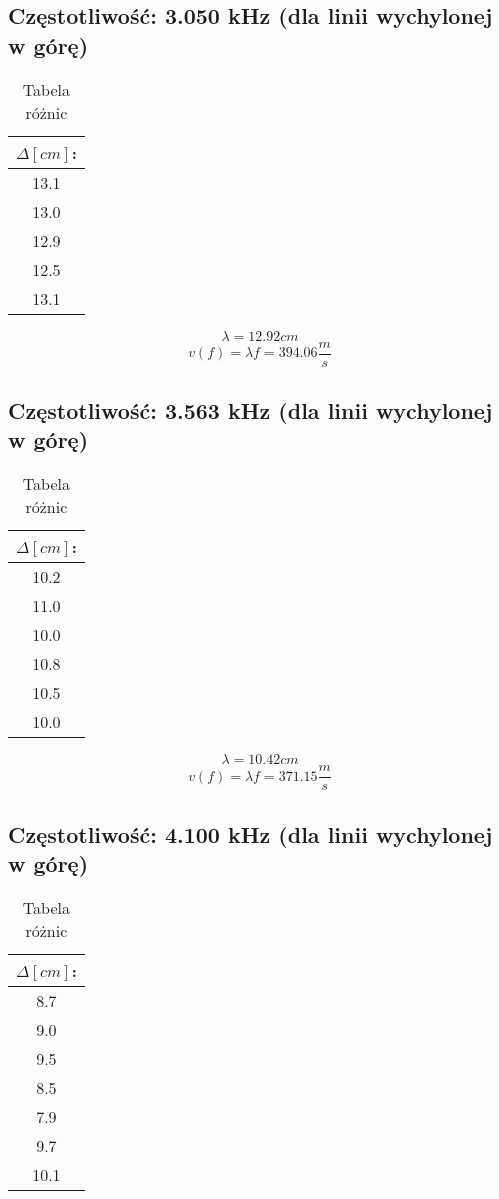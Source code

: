 \documentclass[polish,a4paper]{article}
\begin{document}
\subsection{Częstotliwość: 3.050 kHz (dla linii wychylonej w górę)}

\begin{table}[H]
\centering
\begin{tabular}{|c|}
\hline
$\Delta [cm]$:\\
\hline 
13.1 \\
13.0 \\
12.9 \\
12.5 \\
13.1 \\
\hline
\end{tabular}
\caption{Tabela różnic}
\end{table}

$$\lambda = 12.92 cm$$
$$v(f) = \lambda f = 394.06 \frac{m}{s}$$

\subsection{Częstotliwość: 3.563 kHz (dla linii wychylonej w górę)}

\begin{table}[H]
\centering
\begin{tabular}{|c|}
\hline
$\Delta [cm]$:\\
\hline 
10.2 \\
11.0 \\
10.0 \\
10.8 \\
10.5 \\
10.0 \\
\hline
\end{tabular}
\caption{Tabela różnic}
\end{table}

$$\lambda = 10.42 cm$$
$$v(f) = \lambda f = 371.15 \frac{m}{s}$$

\subsection{Częstotliwość: 4.100 kHz (dla linii wychylonej w górę)}

\begin{table}[H]
\centering
\begin{tabular}{|c|}
\hline
$\Delta [cm]$:\\
\hline 
8.7 \\
9.0 \\
9.5 \\
8.5 \\
7.9 \\
9.7 \\
10.1 \\
\hline
\end{tabular}
\caption{Tabela różnic}
\end{table}
\end{document}
